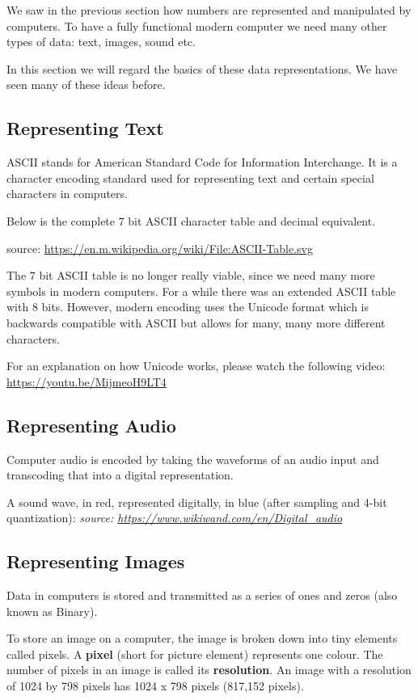 \documentclass[11pt,a4paper]{report}
\newcommand{\bfb}[1]{{\bf \color{blue} #1}}
\begin{document}
We saw in the previous section how numbers are represented and manipulated by computers. To have a fully functional modern computer we need many other types of data: text, images, sound etc. 

In this section we will regard the basics of these data representations. We have seen many of these ideas before. 

\subsection{Representing Text}

ASCII stands for American Standard Code for Information Interchange. It is a character encoding standard used for representing text and certain special characters in computers. 

Below is the complete 7 bit ASCII character table and decimal equivalent.

\hfill source: {\url{https://en.m.wikipedia.org/wiki/File:ASCII-Table.svg}}

The 7 bit ASCII table is no longer really viable, since we need many more symbols in modern computers. For a while there was an extended ASCII table with 8 bits. However, modern encoding uses the Unicode format which is backwards compatible with ASCII but allows for many, many more different characters.

For an explanation on how Unicode works, please watch the following video: \url{https://youtu.be/MijmeoH9LT4}

\subsection{Representing Audio}

Computer audio is encoded by taking the waveforms of an audio input and transcoding that into a digital representation. 

A sound wave, in red, represented digitally, in blue (after sampling and 4-bit quantization):
\hfill \emph{source: \url{https://www.wikiwand.com/en/Digital_audio}}

\subsection{Representing Images}

Data in computers is stored and transmitted as a series of ones and zeros (also known as Binary). 

To store an image on a computer, the image is broken down into tiny elements called pixels. A \bfb{pixel} (short for picture element) represents one colour. The number of pixels in an image is called its \bfb{resolution}. An image with a resolution of 1024 by 798 pixels has 1024 x 798 pixels (817,152 pixels). 
\end{document}

